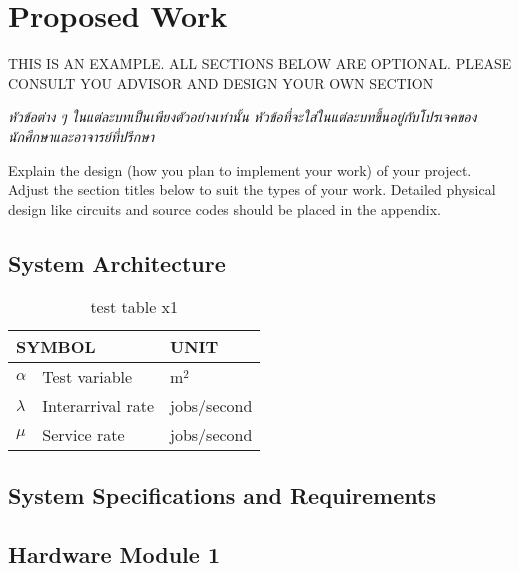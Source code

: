 \chapter{Proposed Work}

THIS IS AN EXAMPLE. ALL SECTIONS BELOW ARE OPTIONAL. PLEASE CONSULT YOU ADVISOR AND DESIGN YOUR OWN SECTION

\emph{\textthai{หัวข้อต่าง ๆ ในแต่ละบทเป็นเพียงตัวอย่างเท่านั้น หัวข้อที่จะใส่ในแต่ละบทขึ้นอยู่กับโปรเจคของนักศึกษาและอาจารย์ที่ปรึกษา}}

Explain the design (how you plan to implement your work) of your project. Adjust the section titles below to suit the types of your work. Detailed physical design like circuits and source codes should be placed in the appendix.

\section{System Architecture}

    \begin{table}[!h]
        \centering
        \caption{test table x1}\label{tbl:symbols}
        \begin{tabular}{@{}p{}|p{}p{}}\hline
        \multicolumn{2}{l}{\textbf{SYMBOL}}  & \textbf{UNIT} \\ \hline 
        $\alpha$ & Test variable\hfill & m$^2$ \\
        $\lambda$ & Interarrival rate\hfill &  jobs/second\\
        $\mu$ & Service rate\hfill & jobs/second \\ \hline
        \end{tabular}
    \end{table}

\section{System Specifications and Requirements}

\pagebreak
\section{Hardware Module 1}
